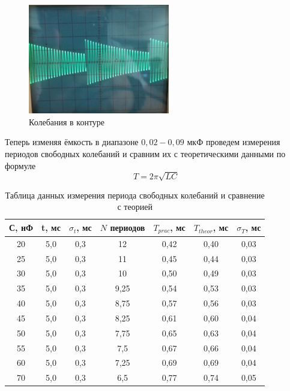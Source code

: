 \documentclass[a4paper, 12pt]{article}%
\begin{document}
\begin{figure}[h!]
\begin{center}
\includegraphics[width = 0.55\textwidth]{3.jpg}
\caption{Колебания в контуре}
\end{center}
\end{figure}

Теперь изменяя ёмкость в диапазоне $0,02 - 0,09$ мкФ проведем измерения периодов свободных колебаний и сравним их с теоретическими данными по формуле 
\[T = 2 \pi \sqrt{LC}\]

\begin{table}[h!]
\begin{center}
\begin{tabular}{|c|c|c|c|c|c|c|}
\hline
С, нФ & t, мс & $\sigma_t$, мс & $N$ периодов & $T_{prac}$, мс & $T_{theor}$, мс & $\sigma_T$, мс \\ \hline
20    & 5,0   & 0,3            & 12           & 0,42           & 0,40            & 0,03           \\ \hline
25    & 5,0   & 0,3            & 11           & 0,45           & 0,44            & 0,03           \\ \hline
30    & 5,0   & 0,3            & 10           & 0,50           & 0,49            & 0,03           \\ \hline
35    & 5,0   & 0,3            & 9,25         & 0,54           & 0,53            & 0,03           \\ \hline
40    & 5,0   & 0,3            & 8,75         & 0,57           & 0,56            & 0,03           \\ \hline
45    & 5,0   & 0,3            & 8,25         & 0,61           & 0,60            & 0,04           \\ \hline
50    & 5,0   & 0,3            & 7,75         & 0,65           & 0,63            & 0,04           \\ \hline
55    & 5,0   & 0,3            & 7,5          & 0,67           & 0,66            & 0,04           \\ \hline
60    & 5,0   & 0,3            & 7,25         & 0,69           & 0,69            & 0,04           \\ \hline
70    & 5,0   & 0,3            & 6,5          & 0,77           & 0,74            & 0,05           \\ \hline
\end{tabular}
\caption{Таблица данных измерения периода свободных колебаний и сравнение с теорией}
\end{center}
\end{table}
\end{document}
